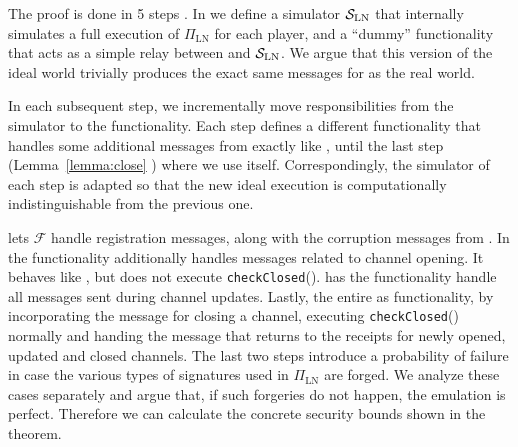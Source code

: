   \begin{proofsketch}
    The proof is done in 5 steps . In
     we
    define a simulator $\mathcal{S}_{\mathrm{LN}}$
    that internally simulates a full execution of $\Pi_{\mathrm{LN}}$ for each
    player, and a ``dummy'' functionality that acts as a simple relay between
    \environment{} and $\mathcal{S}_{\mathrm{LN}}$. We argue that this version of
    the ideal world trivially produces the exact same messages for
    \environment{} as the real world.

    In each subsequent step, we incrementally move responsibilities from the
    simulator to the functionality. Each step defines a
    different functionality that handles some additional messages from
    \environment{} exactly like \fpaynet, until the last step
    (Lemma~\ref{lemma:close} ) where we use \fpaynet{} itself. Correspondingly,
    the simulator of each step is adapted so that the new ideal execution is
    computationally indistinguishable from the previous one. 

     lets $\mathcal{F}$ handle registration messages,
    along with the corruption messages from \simulator. In 
    the functionality additionally handles messages related to channel opening. It
    behaves like \fpaynet, but does not execute \texttt{checkClosed}().
     has the functionality handle all messages sent during
    channel updates. Lastly, 
    the entire \fpaynet{}  as functionality, by incorporating the message for closing a channel,
    executing \texttt{checkClosed}() normally and handing the message that returns
    to \environment{} the receipts for newly opened, updated and closed
    channels. The last two steps introduce a probability of failure in case
    the various types of signatures used in  $\Pi_{\mathrm{LN}}$ are forged. We analyze these cases separately and argue that, if
    such forgeries do not happen, the emulation is perfect. Therefore we can
    calculate the concrete security bounds shown in the theorem.
  \end{proofsketch}
